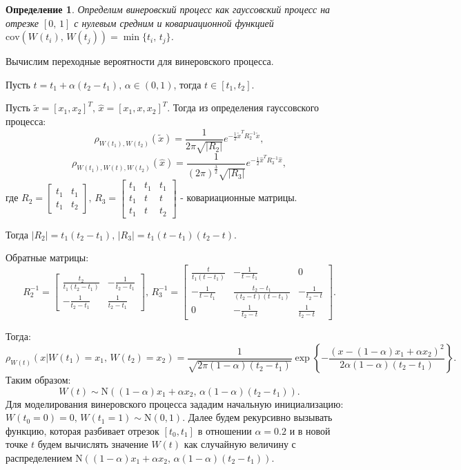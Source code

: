 \documentclass[a4paper, 11pt]{article}
\theoremstyle{def}
\newtheorem{definition}{Определение}[section]
\theoremstyle{th}
\theoremstyle{rem}
\begin{document}
\begin{definition}
        Определим \textit{винеровский процесс} как гауссовский процесс на отрезке $[0,\,1]$ с нулевым средним и ковариационной функцией $\mbox{cov}(W(t_i),\,W(t_j)) = \min\{t_i,\,t_j\}$.
\end{definition}

Вычислим переходные вероятности для винеровского процесса.

Пусть $t = t_1 + \alpha(t_2 - t_1), \, \alpha \in (0, 1)$, тогда $t \in [t_1, t_2].$

Пусть $\tilde{x} = [x_1, x_2]^T, \, \hat{x} = [x_1, x, x_2]^T$. Тогда из определения гауссовского процесса:
$$
\rho_{W(t_1), W(t_2)}(\tilde{x}) = \frac{1}{2\pi\sqrt{|R_2|}} e^{-\frac{1}{2} \tilde{x}^T R_2^{-1} \tilde{x}},
$$
$$
\rho_{W(t_1), W(t), W(t_2)}(\hat{x}) = \frac{1}{(2\pi)^{\frac{3}{2}}\sqrt{|R_3|}} e^{-\frac{1}{2} \hat{x}^T R_3^{-1} \hat{x}},
$$
где $R_2 = \begin{bmatrix} t_1& t_1\\ t_1& t_2 \end{bmatrix}, \, R_3 = \begin{bmatrix} t_1& t_1& t_1\\ t_1& t& t\\ t_1& t& t_2 \end{bmatrix}$ -  ковариационные матрицы.

Тогда $|R_2| = t_1(t_2 - t_1), \, |R_3| = t_1(t - t_1)(t_2 - t)$. 

Обратные матрицы:
$$
R_2^{-1} = \begin{bmatrix} \frac{t_2}{t_1(t_2 - t_1)}& -\frac{1}{t_2 - t_1}\\ -\frac{1}{t_2 - t_1}& \frac{1}{t_2 - t_1} \end{bmatrix}, \, R_3^{-1} = \begin{bmatrix} \frac{t}{t_1(t-t_1)}& -\frac{1}{t-t_1}& 0\\ -\frac{1}{t-t_1}& \frac{t_2-t_1}{(t_2 - t)(t-t_1)}& -\frac{1}{t_2-t}\\0& -\frac{1}{t_2-t}& \frac{1}{t_2-t} \end{bmatrix}.
$$

Тогда:
$$
\rho_{W(t)}(x | W(t_1)=x_1, \,W(t_2) = x_2) = \frac{1}{\sqrt{2\pi(1-\alpha)(t_2 - t_1)}}\exp\left\{-\frac{(x-(1-\alpha)x_1 + \alpha x_2)^2}{2\alpha(1-\alpha)(t_2 - t_1)}\right\}.
$$
Таким образом:
$$
        W(t)
\sim
        \mathrm{N}
        (
          (1 - \alpha)
          x_1
          +
          \alpha
          x_2
        ,\,
          \alpha
          (1 - \alpha)
          (t_2 - t_1)
        ).
$$
Для моделирования винеровского процесса зададим начальную инициализацию: $W(t_0=0) = 0, \, W(t_1=1) \sim \mbox{N}(0, 1).$ Далее будем рекурсивно вызывать функцию, которая разбивает отрезок $[t_0, t_1]$  в отношении $\alpha=0.2$ и в новой точке $t$ будем вычислять значение $W(t)$ как случайную величину с распределением $\mathrm{N}
        (
          (1 - \alpha)
          x_1
          +
          \alpha
          x_2
        ,\,
          \alpha
          (1 - \alpha)
          (t_2 - t_1)
        ).$
        
\end{document}
